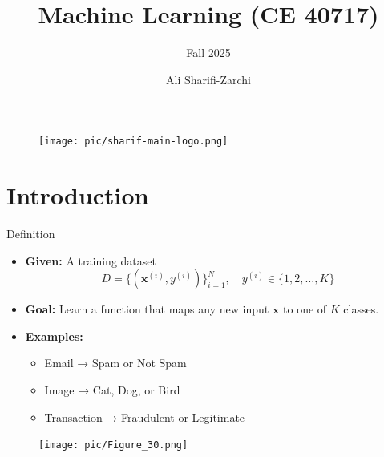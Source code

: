 \documentclass[serif, aspectratio=169]{beamer}
\author{Ali Sharifi-Zarchi}
\title{Machine Learning (CE 40717)}
\subtitle{Fall 2025}
\institute{
    CE Department \\
    Sharif University of Technology
}
\begin{document}
    \begin{frame}
        \titlepage
        \vspace*{-0.6cm}
        \begin{figure}[htpb]
            \begin{center}
                \texttt{[image: pic/sharif-main-logo.png]}
            \end{center}
        \end{figure}
    \end{frame}

    \begin{frame}
        \tableofcontents[sectionstyle=show,
            subsectionstyle=show/shaded/hide,
            subsubsectionstyle=show/shaded/hide]
    \end{frame}

    \section{Introduction}

    \begin{frame}{Definition}
        \begin{minipage}{0.55\textwidth}
            \begin{itemize}\itemsep1em
            \item \textbf{Given:} A training dataset
            \[
                D = \{(\mathbf{x}^{(i)}, y^{(i)})\}_{i=1}^{N}, \quad
                y^{(i)} \in \{1, 2, \dots, K\}
            \]
            \item \textbf{Goal:} Learn a function that maps any new input $\mathbf{x}$ to one of $K$ classes.
            \item \textbf{Examples:}
            \begin{itemize}
                \item Email → Spam or Not Spam
                \item Image → Cat, Dog, or Bird
                \item Transaction → Fraudulent or Legitimate
            \end{itemize}
            \end{itemize}
        \end{minipage}
        \hfill
        \begin{minipage}{0.42\textwidth}
            \begin{figure}
                \centering
                \texttt{[image: pic/Figure\_30.png]}
            \end{figure}
        \end{minipage}
    \end{frame}
\end{document}
